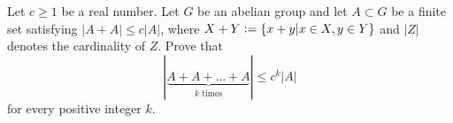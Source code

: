 \documentclass{article}
\begin{document}
\setlength{\parindent}{0pt}
Let $c\ge1$ be a real number. Let $G$ be an abelian group and let $A\subset G$ be a finite set satisfying $|A+A|\le c|A|$, where $X+Y\vcentcolon=\{x+y|x\in X,y\in Y\}$ and $|Z|$ denotes the cardinality of $Z$. Prove that$$|\underbrace{A+A+\dots+A}_{k\text{ times}}|\le c^{k}|A|$$for every positive integer $k$.
\end{document}
